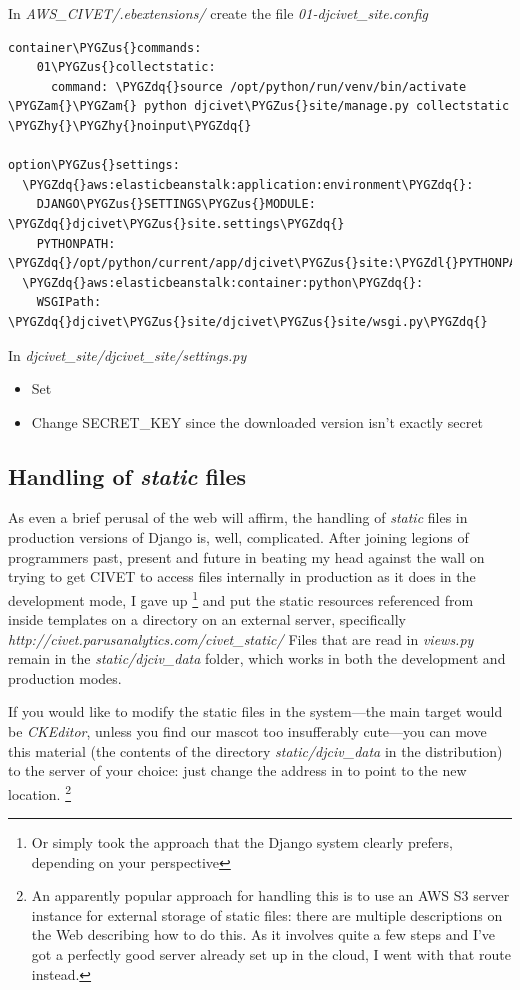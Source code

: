 \documentclass[letterpaper,10pt,english]{sphinxmanual}
\def\PYGZus{\char`\_}
\def\PYGZam{\char`\&}
\def\PYGZdl{\char`\$}
\def\PYGZhy{\char`\-}
\def\PYGZdq{\char`\"}
\begin{document}
In \emph{AWS\_CIVET/.ebextensions/} create the file \emph{01-djcivet\_site.config}

\begin{Verbatim}[commandchars=\\\{\}]
container\PYGZus{}commands:
    01\PYGZus{}collectstatic:
      command: \PYGZdq{}source /opt/python/run/venv/bin/activate \PYGZam{}\PYGZam{} python djcivet\PYGZus{}site/manage.py collectstatic \PYGZhy{}\PYGZhy{}noinput\PYGZdq{}

option\PYGZus{}settings:
  \PYGZdq{}aws:elasticbeanstalk:application:environment\PYGZdq{}:
    DJANGO\PYGZus{}SETTINGS\PYGZus{}MODULE: \PYGZdq{}djcivet\PYGZus{}site.settings\PYGZdq{}
    PYTHONPATH: \PYGZdq{}/opt/python/current/app/djcivet\PYGZus{}site:\PYGZdl{}PYTHONPATH\PYGZdq{}
  \PYGZdq{}aws:elasticbeanstalk:container:python\PYGZdq{}:
    WSGIPath: \PYGZdq{}djcivet\PYGZus{}site/djcivet\PYGZus{}site/wsgi.py\PYGZdq{}
\end{Verbatim}

In \emph{djcivet\_site/djcivet\_site/settings.py}
\begin{itemize}
\item {} 
Set 

\item {} 
Change SECRET\_KEY since the downloaded version isn't exactly secret

\end{itemize}


\subsection{Handling of \emph{static} files}
\label{appendix5:handling-of-static-files}
As even a brief perusal of the web will affirm, the handling of \emph{static} files in production versions of
Django is, well, complicated. After joining legions of programmers past, present and future in beating my head against
the wall on trying to get CIVET to access files internally in production as it does in the development mode, I gave up \footnote{
Or simply took the approach that the Django system clearly prefers, depending on your perspective
}
and put the static resources referenced from inside templates on a directory on an external server, specifically
\emph{http://civet.parusanalytics.com/civet\_static/}  Files that are read in \emph{views.py} remain in the \emph{static/djciv\_data}
folder, which works in both the development and production modes.

If you would like to modify the static files in the system—the main target would be \emph{CKEditor}, unless you find our
mascot too insufferably cute—you can move this material (the contents of the directory \emph{static/djciv\_data} in the distribution) to
the server of your choice: just change the address in  to point to the new location. \footnote{
An apparently popular approach for handling this is to use an AWS S3 server instance for external storage of static files:
there are multiple descriptions on the Web describing how to do this. As it involves quite a few steps and I've
got a perfectly good server already set up in the cloud, I went with that route instead.
}
\end{document}
